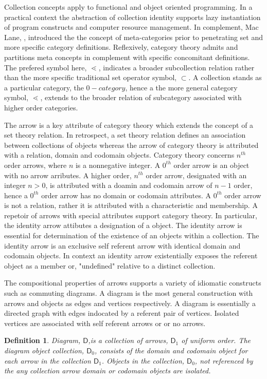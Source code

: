 \documentclass[aps,twocolumn,secnumarabic,nobalancelastpage,amsmath,amssymb,
amsthm,nofootinbib,parskip=full]{revtex4}
\numberwithin{equation}{section}
\newtheorem{definition}{Definition}[section]
\newcommand{\diag}[1]{\mathbf{\mathsf{#1}}}
\newcommand{\diagobj}[1]{\diag{#1}_0}
\newcommand{\diagarr}[1]{\diag{#1}_1}
\begin{document}
Collection concepts apply to functional and object oriented programming.
In a practical context the abstraction
of collection identity supports lazy instantiation
of program constructs and computer resource management.
In complement, Mac Lane, \cite{maclane1998}, introduced the
the concept of meta-categories prior to penetrating set
and more specific category definitions. Reflexively, category
theory admits and partitions meta concepts in complement
with specific concomitant definitions.
The prefered symbol here, $\lessdot$, indicates a broader subcollection relation
rather than the more specific traditional set operator symbol, $\subset$.
A collection stands as a particular category, the $0-category$,
hence a the more general category symbol, $\lessdot$,
extends to the broader relation of subcategory
associated with higher order categories.

The arrow is a key attribute of category theory which
extends the concept of a set theory relation.
In retrospect, a set theory relation defines an association between
collections of objects whereas the arrow of category theory is attributed
with a relation, domain and codomain objects.
Category theory concerns $n^{th}$ order arrows,
where $n$ is a nonnegative integer.
A $0^{th}$ order arrow is an object with no arrow arributes.
A higher order, $n^{th}$ order arrow, designated with an integer $n>0$,
is attributed with a doamin and codomain arrow of $n-1$ order,
hence a $0^{th}$ order arrow has no domain or codomain attributes.
A $0^{th}$ order arrow is not a relation, rather it is attributed with
a characteristic and membership.
A repetoir of arrows with special attributes support category theory.
In particular, the identity arrow attibutes a designation of a object.
The identity arrow is essential for determination of the existence of an
objects within a collection. The identity arrow is an exclusive self referent
arrow with identical domain and codomain objects.
In context an identity arrow existentially exposes the referent
object as a member or, "undefined" relative to a distinct collection.

The compositional properties of arrows supports a variety of
idiomatic constructs such as commuting diagrams. A diagram is the
most general construction with arrows and objects
as edges and vertices respectively.
A diagram is essentially a directed graph with edges indocated by a
referent pair of vertices. Isolated vertices
are associated with self referent arrows or or no arrows.

\begin{definition}{Diagram, $\diag{D}$},\label{def:diagram}
  is a collection of arrows, $\diagarr{D}$ of uniform order.
  The diagram object collection,
  $\diagobj{D}$, consists of the domain and codomain object for each arrow
  in the collection $\diagarr{D}$.
  Objects in the collection, $\diagobj{D}$, not referenced by the
  any collection arrow domain or codomain objects are isolated.
\end{definition}
\end{document}
